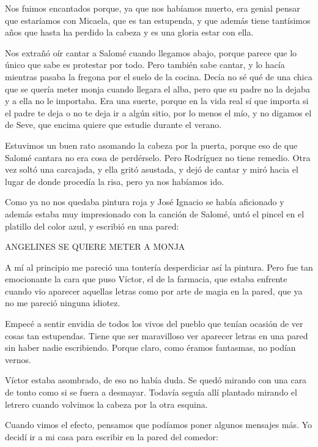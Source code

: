 \documentclass{barcodevapor3pags}
\begin{document}
Nos fuimos encantados porque, ya que nos habíamos muerto, era genial
pensar que estaríamos con Micaela, que es tan estupenda, y que además
tiene tantísimos años que hasta ha perdido la cabeza y es una gloria
estar con ella.~

Nos extrañó oír cantar a Salomé cuando llegamos abajo, porque parece que
lo único que sabe es protestar por todo. Pero también sabe cantar, y lo
hacía mientras pasaba la fregona por el suelo de la cocina. Decía no sé
qué de una chica que se quería meter monja cuando llegara el alba, pero
que su padre no la dejaba y a ella no le importaba. Era una suerte,
porque en la vida real sí que importa si el padre te deja o no te deja
ir a algún sitio, por lo menos el mío, y no digamos el de Seve, que
encima quiere que estudie durante el verano.~

Estuvimos un buen rato asomando la cabeza por la puerta, porque eso de
que Salomé cantara no era cosa de perdérselo. Pero Rodríguez no tiene
remedio. Otra vez soltó una carcajada, y ella gritó asustada, y dejó de
cantar y miró hacia el lugar de donde procedía la risa, pero ya nos
habíamos ido.~

Como ya no nos quedaba pintura roja y José Ignacio se había aficionado y
además estaba muy impresionado con la canción de Salomé, untó el pincel
en el platillo del color azul, y escribió en una pared:

\begin{center}ANGELINES SE QUIERE METER A MONJA\end{center}


A mí al principio me pareció una tontería desperdiciar así la pintura.
Pero fue tan emocionante la cara que puso Víctor, el de la farmacia, que
estaba enfrente cuando vio aparecer aquellas letras como por arte de
magia en la pared, que ya no me pareció ninguna idiotez.~

Empecé a sentir envidia de todos los vivos del pueblo que tenían ocasión
de ver cosas tan estupendas. Tiene que ser maravilloso ver aparecer
letras en una pared sin haber nadie escribiendo. Porque claro, como
éramos fantasmas, no podían vernos.~

Víctor estaba asombrado, de eso no había duda. Se quedó mirando con una
cara de tonto como si se fuera a desmayar. Todavía seguía allí plantado
mirando el letrero cuando volvimos la cabeza por la otra esquina.~

Cuando vimos el efecto, pensamos que podíamos poner algunos mensajes
más. Yo decidí ir a mi casa para escribir en la pared del comedor:
\end{document}
